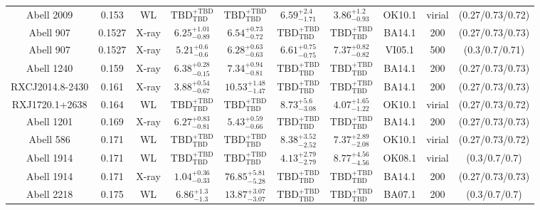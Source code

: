 \begin{table}
\begin{tabular}{cccccccccc}
Abell 2009 & 0.153 & WL & ${\mathrm{TBD}}^{+\mathrm{TBD}}_{\mathrm{TBD}}$ & ${\mathrm{TBD}}^{+\mathrm{TBD}}_{\mathrm{TBD}}$ & ${6.59}^{+2.4}_{-1.71}$ & ${3.86}^{+1.2}_{-0.93}$ & OK10.1 & virial & (0.27/0.73/0.72) \\
Abell 907 & 0.1527 & X-ray & ${6.25}^{+1.01}_{-0.89}$ & ${6.54}^{+0.73}_{-0.72}$ & ${\mathrm{TBD}}^{+\mathrm{TBD}}_{\mathrm{TBD}}$ & ${\mathrm{TBD}}^{+\mathrm{TBD}}_{\mathrm{TBD}}$ & BA14.1 & 200 & (0.27/0.73/0.73) \\
Abell 907 & 0.1527 & X-ray & ${5.21}^{+0.6}_{-0.6}$ & ${6.28}^{+0.63}_{-0.63}$ & ${6.61}^{+0.75}_{-0.75}$ & ${7.37}^{+0.82}_{-0.82}$ & VI05.1 & 500 & (0.3/0.7/0.71) \\
Abell 1240 & 0.159 & X-ray & ${6.38}^{+0.28}_{-0.15}$ & ${7.34}^{+0.94}_{-0.81}$ & ${\mathrm{TBD}}^{+\mathrm{TBD}}_{\mathrm{TBD}}$ & ${\mathrm{TBD}}^{+\mathrm{TBD}}_{\mathrm{TBD}}$ & BA14.1 & 200 & (0.27/0.73/0.73) \\
RXCJ2014.8-2430 & 0.161 & X-ray & ${3.88}^{+0.54}_{-0.67}$ & ${10.53}^{+1.48}_{-1.47}$ & ${\mathrm{TBD}}^{+\mathrm{TBD}}_{\mathrm{TBD}}$ & ${\mathrm{TBD}}^{+\mathrm{TBD}}_{\mathrm{TBD}}$ & BA14.1 & 200 & (0.27/0.73/0.73) \\
RXJ1720.1+2638 & 0.164 & WL & ${\mathrm{TBD}}^{+\mathrm{TBD}}_{\mathrm{TBD}}$ & ${\mathrm{TBD}}^{+\mathrm{TBD}}_{\mathrm{TBD}}$ & ${8.73}^{+5.6}_{-3.08}$ & ${4.07}^{+1.65}_{-1.22}$ & OK10.1 & virial & (0.27/0.73/0.72) \\
Abell 1201 & 0.169 & X-ray & ${6.27}^{+0.83}_{-0.81}$ & ${5.43}^{+0.59}_{-0.66}$ & ${\mathrm{TBD}}^{+\mathrm{TBD}}_{\mathrm{TBD}}$ & ${\mathrm{TBD}}^{+\mathrm{TBD}}_{\mathrm{TBD}}$ & BA14.1 & 200 & (0.27/0.73/0.73) \\
Abell 586 & 0.171 & WL & ${\mathrm{TBD}}^{+\mathrm{TBD}}_{\mathrm{TBD}}$ & ${\mathrm{TBD}}^{+\mathrm{TBD}}_{\mathrm{TBD}}$ & ${8.38}^{+3.52}_{-2.52}$ & ${7.37}^{+2.89}_{-2.08}$ & OK10.1 & virial & (0.27/0.73/0.72) \\
Abell 1914 & 0.171 & WL & ${\mathrm{TBD}}^{+\mathrm{TBD}}_{\mathrm{TBD}}$ & ${\mathrm{TBD}}^{+\mathrm{TBD}}_{\mathrm{TBD}}$ & ${4.13}^{+2.79}_{-2.79}$ & ${8.77}^{+4.56}_{-4.56}$ & OK08.1 & virial & (0.3/0.7/0.7) \\
Abell 1914 & 0.171 & X-ray & ${1.04}^{+0.36}_{-0.33}$ & ${76.85}^{+5.81}_{-5.28}$ & ${\mathrm{TBD}}^{+\mathrm{TBD}}_{\mathrm{TBD}}$ & ${\mathrm{TBD}}^{+\mathrm{TBD}}_{\mathrm{TBD}}$ & BA14.1 & 200 & (0.27/0.73/0.73) \\
Abell 2218 & 0.175 & WL & ${6.86}^{+1.3}_{-1.3}$ & ${13.87}^{+3.07}_{-3.07}$ & ${\mathrm{TBD}}^{+\mathrm{TBD}}_{\mathrm{TBD}}$ & ${\mathrm{TBD}}^{+\mathrm{TBD}}_{\mathrm{TBD}}$ & BA07.1 & 200 & (0.3/0.7/0.7) \\

\end{tabular}
\end{table}
